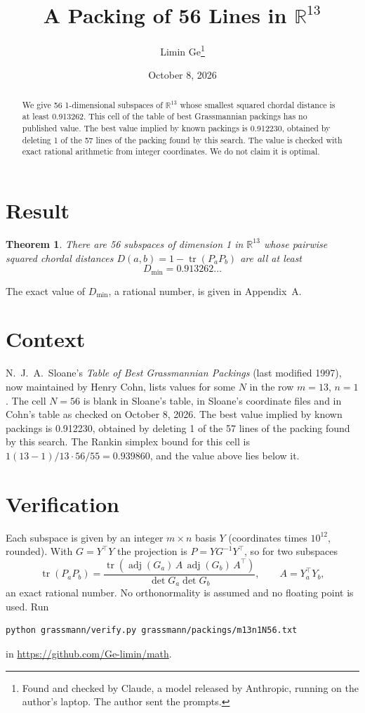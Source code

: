 \documentclass[11pt,a4paper]{article}
\title{A Packing of 56 Lines in $\mathbb{R}^{13}$}
\author{Limin Ge\thanks{Found and checked by Claude, a model released by Anthropic, running on the author's laptop. The author sent the prompts.}}
\date{October 8, 2026}
\newtheorem*{theorem}{Theorem}
\begin{document}
\maketitle
\begin{abstract}
We give 56 1-dimensional subspaces of $\mathbb{R}^{13}$ whose smallest squared chordal distance is at least 0.913262. This cell of the table of best Grassmannian packings has no published value. The best value implied by known packings is 0.912230, obtained by deleting 1 of the 57 lines of the packing found by this search. The value is checked with exact rational arithmetic from integer coordinates. We do not claim it is optimal.
\end{abstract}

\section{Result}
\begin{theorem}
There are 56 subspaces of dimension 1 in $\mathbb{R}^{13}$ whose pairwise squared chordal distances $D(a,b) = 1 - \operatorname{tr}(P_aP_b)$ are all at least
\[ D_{\min} = 0.913262\ldots \]
\end{theorem}
The exact value of $D_{\min}$, a rational number, is given in Appendix~A.


\section{Context}
N.~J.~A.~Sloane's \emph{Table of Best Grassmannian Packings} (last modified 1997), now maintained by Henry Cohn, lists values for some $N$ in the row $m=13$, $n=1$. The cell $N=56$ is blank in Sloane's table, in Sloane's coordinate files and in Cohn's table as checked on October 8, 2026. The best value implied by known packings is 0.912230, obtained by deleting 1 of the 57 lines of the packing found by this search. The Rankin simplex bound for this cell is $1(13-1)/13\cdot 56/55 = 0.939860$, and the value above lies below it.


\section{Verification}
Each subspace is given by an integer $m\times n$ basis $Y$ (coordinates times $10^{12}$, rounded). With $G=Y^\top Y$ the projection is $P=YG^{-1}Y^\top$, so for two subspaces
\[ \operatorname{tr}(P_aP_b)=\frac{\operatorname{tr}(\operatorname{adj}(G_a)\,A\,\operatorname{adj}(G_b)\,A^\top)}{\det G_a\det G_b},\qquad A=Y_a^\top Y_b, \]
an exact rational number. No orthonormality is assumed and no floating point is used. Run
\begin{verbatim}
python grassmann/verify.py grassmann/packings/m13n1N56.txt
\end{verbatim}
in \url{https://github.com/Ge-limin/math}.
\end{document}

